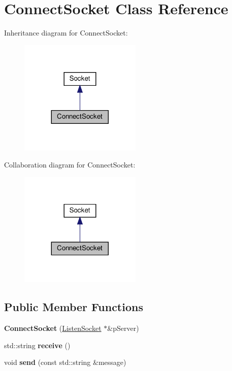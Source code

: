 \hypertarget{classConnectSocket}{}\section{Connect\+Socket Class Reference}
\label{classConnectSocket}


Inheritance diagram for Connect\+Socket\+:\nopagebreak
\begin{figure}[H]
\begin{center}
\leavevmode
\includegraphics[width=164pt]{classConnectSocket__inherit__graph}
\end{center}
\end{figure}


Collaboration diagram for Connect\+Socket\+:\nopagebreak
\begin{figure}[H]
\begin{center}
\leavevmode
\includegraphics[width=164pt]{classConnectSocket__coll__graph}
\end{center}
\end{figure}
\subsection*{Public Member Functions}
\begin{DoxyCompactItemize}
\item 
\mbox{\label{classConnectSocket_ad1db4adc587e2b582d42e71009dd3d6e}} 
{\bfseries Connect\+Socket} (\hyperlink{classListenSocket}{Listen\+Socket} $\ast$\&p\+Server)
\item 
\mbox{\label{classConnectSocket_a39263b739672a96ad911ff57803ce9d7}} 
std\+::string {\bfseries receive} ()
\item 
\mbox{\label{classConnectSocket_ae3792d4b1c27f814c97ba06c15dc323a}} 
void {\bfseries send} (const std\+::string \&message)
\end{DoxyCompactItemize}
